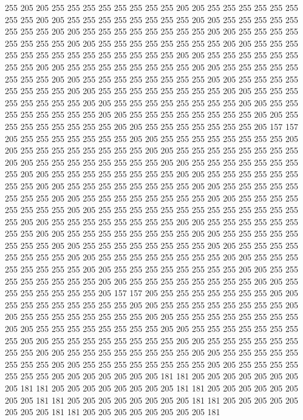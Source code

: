 255 205 205 255 255 255 255 255 255 255 255 205 205 255 255 255 255 255 255 255
255 205 205 255 255 255 255 255 255 255 255 205 205 255 255 255 255 255 255 255
255 205 205 255 255 255 255 255 255 255 255 205 205 255 255 255 255 255 255 255
255 205 205 255 255 255 255 255 255 255 255 205 205 255 255 255 255 255 255 255
255 255 255 255 255 255 255 205 205 255 255 255 255 255 255 255 255 205 205 255
255 255 255 255 255 255 255 205 205 255 255 255 255 255 255 255 255 205 205 255
255 255 255 255 255 255 255 205 205 255 255 255 255 255 255 255 255 205 205 255
255 255 255 255 255 255 255 205 205 255 255 255 255 255 255 255 255 205 205 255
255 255 255 255 255 255 255 205 205 255 255 255 255 255 255 255 255 205 205 255
255 255 255 255 255 255 255 205 205 255 255 255 255 255 255 255 255 205 205 255
255 255 255 255 255 255 205 157 157 205 255 255 255 255 255 255 255 205 205 255
255 255 255 255 255 255 255 205 205 255 255 255 255 255 255 255 255 205 205 255
255 255 255 255 255 255 255 205 205 255 255 255 255 255 255 255 255 205 205 255
255 255 255 255 255 255 255 205 205 255 255 255 255 255 255 255 255 205 205 255
255 255 255 255 255 255 255 205 205 255 255 255 255 255 255 255 255 205 205 255
255 255 255 255 255 255 255 205 205 255 255 255 255 255 255 255 255 205 205 255
255 255 255 255 255 255 255 205 205 255 255 255 255 255 255 255 255 255 255 255
255 255 255 205 205 255 255 255 255 255 255 255 255 205 205 255 255 255 255 255
255 255 255 205 205 255 255 255 255 255 255 255 255 205 205 255 255 255 255 255
255 255 255 205 205 255 255 255 255 255 255 255 255 205 205 255 255 255 255 255
255 255 255 205 205 255 255 255 255 255 255 255 255 205 205 255 255 255 255 255
255 255 255 205 205 255 255 255 255 255 255 255 255 205 205 255 255 255 255 255
255 255 255 205 205 255 255 255 255 255 255 255 255 205 205 255 255 255 255 255
255 255 205 157 157 205 255 255 255 255 255 255 255 205 205 255 255 255 255 255
255 255 255 205 205 255 255 255 255 255 255 255 255 205 205 255 255 255 255 255
255 255 255 205 205 255 255 255 255 255 255 255 255 205 205 255 255 255 255 255
255 255 255 205 205 255 255 255 255 255 255 255 255 205 205 255 255 255 255 255
255 255 255 205 205 255 255 255 255 255 255 255 255 205 205 255 255 255 255 255
255 255 255 205 205 255 255 255 255 255 255 255 255 205 205 255 255 255 255 255
255 255 255 205 205 255 255 255 255 255 255 255 205 205 205 205 205 205 205 181
181 205 205 205 205 205 205 205 205 181 181 205 205 205 205 205 205 205 205 181
181 205 205 205 205 205 205 205 205 181 181 205 205 205 205 205 205 205 205 181
181 205 205 205 205 205 205 205 205 181 181 205 205 205 205 205 205 205 205 181
